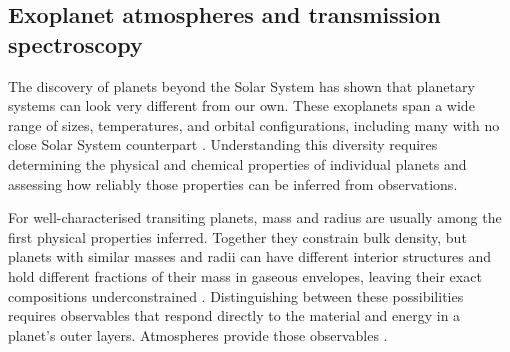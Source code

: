 \subsection{Exoplanet atmospheres and transmission spectroscopy}
\label{sec:atmospheres-transmission}
\label{sec:exoplanets-targets}
\label{sec:observing-atmospheres}

The discovery of planets beyond the Solar System has shown that planetary
systems can look very different from our own. These exoplanets span a wide
range of sizes, temperatures, and orbital configurations, including many with
no close Solar System counterpart \citep{WinnFabrycky2015}. Understanding this
diversity requires determining the physical and chemical properties of
individual planets and assessing how reliably those properties can be inferred
from observations.

For well-characterised transiting planets, mass and radius are usually among
the first physical properties inferred. Together they constrain bulk density,
but planets with similar masses and radii can have different interior
structures and hold different fractions of their mass in gaseous envelopes,
leaving their exact compositions
underconstrained
\citep{RogersSeager2010}. Distinguishing between these possibilities requires
observables that respond directly to the material and energy in a planet's
outer layers. Atmospheres provide those observables
\citep{Madhusudhan2019}.

